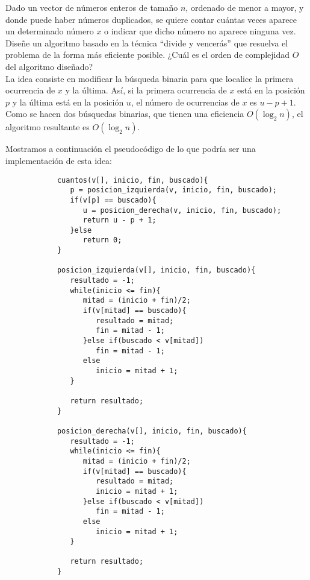 \documentclass[12pt]{article}
\begin{document}
    \begin{ejercicio}[2 puntos]
        Dado un vector de números enteros de tamaño $n$, ordenado de menor a mayor, y donde puede haber números duplicados, se quiere contar cuántas veces aparece un determinado número $x$ o indicar que dicho número no aparece ninguna vez. Diseñe un algoritmo basado en la técnica ``divide y vencerás'' que resuelva el problema de la forma más eficiente posible. ¿Cuál es el orden de complejidad $O$ del algoritmo diseñado?\\

        \noindent
        La idea consiste en modificar la búsqueda binaria para que localice la primera ocurrencia de $x$ y la última. Así, si la primera ocurrencia de $x$ está en la posición $p$ y la última está en la posición $u$, el número de ocurrencias de $x$ es $u-p+1$. Como se hacen dos búsquedas binarias, que tienen una eficiencia $O(\log_2n)$, el algoritmo resultante es $O(\log_2n)$. 

        Mostramos a continuación el pseudocódigo de lo que podría ser una implementación de esta idea:
        \begin{verbatim}
            cuantos(v[], inicio, fin, buscado){
               p = posicion_izquierda(v, inicio, fin, buscado);
               if(v[p] == buscado){
                  u = posicion_derecha(v, inicio, fin, buscado);
                  return u - p + 1;
               }else
                  return 0;
            }

            posicion_izquierda(v[], inicio, fin, buscado){
               resultado = -1;
               while(inicio <= fin){
                  mitad = (inicio + fin)/2;
                  if(v[mitad] == buscado){
                     resultado = mitad;
                     fin = mitad - 1;
                  }else if(buscado < v[mitad])
                     fin = mitad - 1;
                  else
                     inicio = mitad + 1;
               }

               return resultado;
            }

            posicion_derecha(v[], inicio, fin, buscado){
               resultado = -1;
               while(inicio <= fin){
                  mitad = (inicio + fin)/2;
                  if(v[mitad] == buscado){
                     resultado = mitad;
                     inicio = mitad + 1;
                  }else if(buscado < v[mitad])
                     fin = mitad - 1;
                  else
                     inicio = mitad + 1;
               }

               return resultado;
            }
        \end{verbatim}
    \end{ejercicio}
\end{document}

